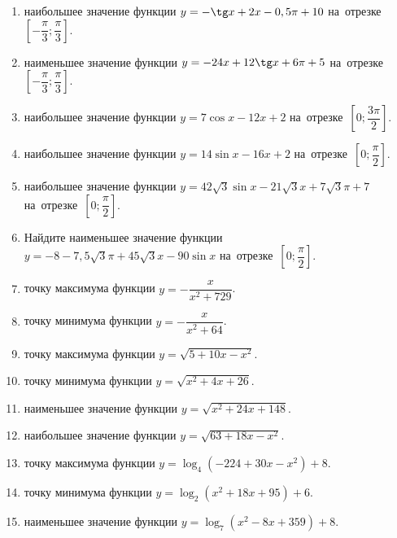 \documentclass[a4paper,10pt]{article}
\begin{document}
\begin{enumerate}
\item {} наибольшее значение функции $y=-\tg x +2x-0,5\pi +10$ на~отрезке~$\left[-\dfrac{\pi}{3};\dfrac{\pi}{3}\right]$.

\item {} наименьшее значение функции $y=-24x +12\tg x+6\pi+5$ на~отрезке~$\left[-\dfrac{\pi}{3};\dfrac{\pi}{3}\right]$.

\item {} наибольшее значение функции $y=7\cos x-12x+2$ на~отрезке~$\left[0;\dfrac{3\pi}{2}\right]$.

\item {} наибольшее значение функции $y=14\sin x-16x+2$ на~отрезке~$\left[0;\dfrac{\pi}{2}\right]$.

\item {} наибольшее значение функции $y=42\sqrt{3}\sin x-21\sqrt{3}x+7\sqrt{3}\pi +7$ на~отрезке~$\left[0;\dfrac{\pi}{2}\right]$.

\item Найдите наименьшее значение функции $y=-8-7,5\sqrt{3}\pi+45\sqrt{3}x-90\sin x$ на~отрезке~$\left[0;\dfrac{\pi}{2}\right]$.

\item {} точку максимума функции $y=-\dfrac{x}{ x^2 +729}$.

\item {} точку минимума функции $y=-\dfrac{x}{ x^2 +64}$.

\item {} точку максимума функции $y=\sqrt{5+10x-x^2}$.

\item {} точку минимума функции $y=\sqrt{x^2+4x+26}$.

\item {} наименьшее значение функции $y=\sqrt{x^2+24x+148}$.

\item {} наибольшее значение функции $y=\sqrt{63+18x-x^2}$.

\item {} точку максимума функции $y=\log_4\left(-224+30x-x^2\right)+8$.

\item {} точку минимума функции $y=\log_2\left(x^2+18x+95\right)+6$.

\item {} наименьшее значение функции $y=\log_7\left(x^2-8x+359\right)+8$.


\end{enumerate}
\end{document}
